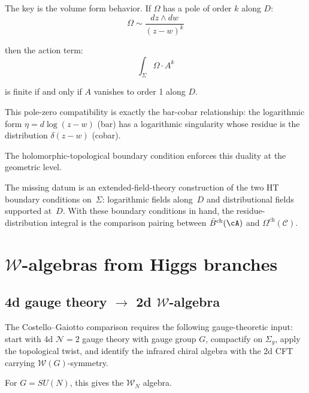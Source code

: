 \begin{evidence}
The key is the volume form behavior. If $\Omega$ has a pole of order $k$ along
$D$:
\[\Omega \sim \frac{dz \wedge dw}{(z-w)^k}\]

then the action term:
\[\int_{\Sigma} \Omega \cdot A^k\]

is finite if and only if $A$ vanishes to order 1 along $D$.

This pole-zero compatibility is exactly the bar-cobar relationship: the logarithmic form $\eta = d\log(z-w)$ (bar) has a logarithmic singularity whose residue is the distribution $\delta(z-w)$ (cobar).

The holomorphic-topological boundary condition enforces this duality at the
geometric level.
\end{evidence}

\begin{remark}
The missing datum is an extended-field-theory construction of the two
HT boundary conditions on~$\Sigma$: logarithmic fields along~$D$ and
distributional fields supported at~$D$. With these boundary conditions
in hand, the residue-distribution integral is the comparison pairing
between $\bar B^{\mathrm{ch}}(\cA)$ and $\Omega^{\mathrm{ch}}(\mathcal C)$.
\end{remark}

\section{$\mathcal{W}$-algebras from Higgs branches}

\subsection{\texorpdfstring{4d gauge theory $\to$ 2d $\mathcal{W}$-algebra}{4d gauge theory -> 2d $\mathcal{W}$-algebra}}

\begin{remark}
The Costello--Gaiotto comparison requires the following gauge-theoretic
input: start with 4d $\mathcal{N}=2$ gauge theory with gauge group $G$,
compactify on $\Sigma_g$, apply the topological twist, and identify the
infrared chiral algebra with the 2d CFT carrying
$\mathcal{W}(G)$-symmetry.

For $G = SU(N)$, this gives the $\mathcal{W}_N$ algebra.
\end{remark}

